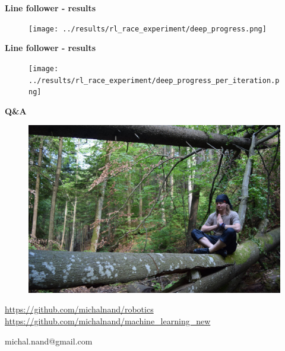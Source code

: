 \documentclass[xcolor=dvipsnames]{beamer}
\begin{document}
\begin{frame}{\bf Line follower - results}


\centering
\begin{figure}[C]
   \texttt{[image: ../results/rl\_race\_experiment/deep\_progress.png]}
\end{figure}

\end{frame}




\begin{frame}{\bf Line follower - results}


\centering
\begin{figure}[C]
   \texttt{[image: ../results/rl\_race\_experiment/deep\_progress\_per\_iteration.png]}
\end{figure}

\end{frame}

\begin{frame}{\bf Q\&A}

\begin{figure}[ht]
\begin{center}
\begin{minipage}{0.8\linewidth}
\begin{center}
 \includegraphics[width=1.0\textwidth]{../pictures/me.jpg}
\end{center}
\end{minipage}
\end{center}
\end{figure}

\url{https://github.com/michalnand/robotics}
\url{https://github.com/michalnand/machine\_learning\_new}

\centerline{michal.nand@gmail.com}

\end{frame}
\end{document}
